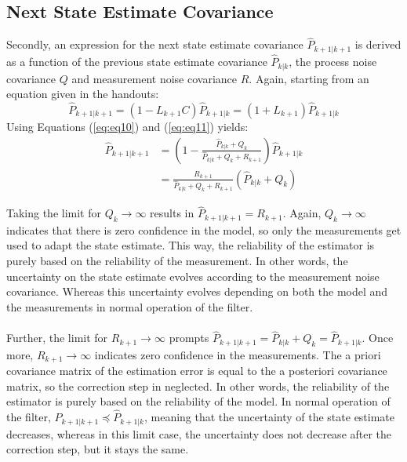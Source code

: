 \documentclass[a4paper,kul]{kulakarticle} %
\begin{document}
\subsection{Next State Estimate Covariance}
Secondly, an expression for the next state estimate covariance $\hat{P}_{k+1|k+1}$ is derived as a function of the previous state estimate covariance $\hat{P}_{k|k}$, the process noise covariance $Q$ and measurement noise covariance $R$. Again, starting from an equation given in the handouts: 
\begin{equation}
	\hat{P}_{k+1|k+1} = (1 - L_{k+1} C)\hat{P}_{k+1|k} = (1 + L_{k+1})\hat{P}_{k+1|k}
\end{equation}
Using Equations (\ref{eq:eq10}) and (\ref{eq:eq11}) yields:
\begin{equation}
	\begin{split}
	\hat{P}_{k+1|k+1} &= \left(1 - \frac{\hat{P}_{k|k} + Q_k}{\hat{P}_{k|k} + Q_k + R_{k+1}}\right) \hat{P}_{k+1|k} \\
	&= \frac{R_{k+1}}{\hat{P}_{k|k} + Q_k + R_{k+1}}\left(\hat{P}_{k|k} + Q_k\right)
	\end{split}
	\label{eq:eq13}
\end{equation}

\noindent Taking the limit for $Q_k \rightarrow \infty$ results in $\hat{P}_{k+1|k+1} = R_{k+1}$. Again,  $Q_k \rightarrow \infty$ indicates that there is zero confidence in the model, so only the measurements get used to adapt the state estimate. This way, the reliability of the estimator is purely based on the reliability of the measurement. In other words, the uncertainty on the state estimate evolves according to the measurement noise covariance. Whereas this uncertainty evolves depending on both the model and the measurements in normal operation of the filter.
\\\\
Further, the limit for $R_{k+1} \rightarrow \infty$ prompts $\hat{P}_{k+1|k+1} = \hat{P}_{k|k} + Q_k = \hat{P}_{k+1|k}$. Once more, $R_{k+1} \rightarrow \infty$ indicates zero confidence in the measurements. The a priori covariance matrix of the estimation error is equal to the a posteriori covariance matrix, so the correction step in neglected. In other words, the reliability of the estimator is purely based on the reliability of the model. In normal operation of the filter, $\hat{P}_{k+1|k+1} \preceq \hat{P}_{k+1|k}$, meaning that the uncertainty of the state estimate decreases, whereas in this limit case, the uncertainty does not decrease after the correction step, but it stays the same.
\end{document}
